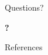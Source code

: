 \documentclass[aspectratio=169,11pt]{beamer}
\begin{document}
\begin{frame}{Questions?}
    \begin{center}
        \Huge\textbf{?}
    \end{center}
\end{frame}

\begin{frame}[allowframebreaks]{References}
    \printbibliography
\end{frame}
\end{document}
